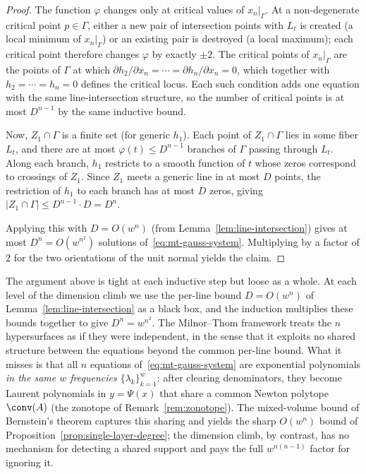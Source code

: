 \begin{proof}
The function $\varphi$ changes only at critical values of $x_n|_\Gamma$. At a non-degenerate critical point $p\in \Gamma$, either a new pair of intersection points with $L_t$ is created (a local minimum of $x_n|_\Gamma$) or an existing pair is destroyed (a local maximum); each critical point therefore changes $\varphi$ by exactly $\pm 2$. The critical points of $x_n|_\Gamma$ are the points of $\Gamma$ at which $\partial h_2/\partial x_n = \cdots = \partial h_n/\partial x_n = 0$, which together with $h_2 = \cdots = h_n = 0$ defines the critical locus. Each such condition adds one equation with the same line-intersection structure, so the number of critical points is at most $D^{n-1}$ by the same inductive bound.

Now, $Z_1\cap \Gamma$ is a finite set (for generic $h_1$). Each point of $Z_1 \cap \Gamma$ lies in some fiber $L_t$, and there are at most $\varphi(t) \leq D^{n-1}$ branches of $\Gamma$ passing through $L_t$. Along each branch, $h_1$ restricts to a smooth function of $t$ whose zeros correspond to crossings of $Z_1$. Since $Z_1$ meets a generic line in at most $D$ points, the restriction of $h_1$ to each branch has at most $D$ zeros, giving $|Z_1\cap \Gamma| \leq D^{n-1}\cdot D = D^n$.

Applying this with $D = O(w^n)$ (from Lemma~\ref{lem:line-intersection}) gives at most $D^n = O(w^{n^2})$ solutions of~\eqref{eq:mt-gauss-system}. Multiplying by a factor of $2$ for the two orientations of the unit normal yields the claim.
\end{proof}

\begin{remark}
The argument above is tight at each inductive step but loose as a whole. At each level of the dimension climb we use the per-line bound $D = O(w^n)$ of Lemma~\ref{lem:line-intersection} as a black box, and the induction multiplies these bounds together to give $D^n = w^{n^2}$. The Milnor--Thom framework treats the $n$ hypersurfaces as if they were independent, in the sense that it exploits no shared structure between the equations beyond the common per-line bound. What it misses is that all $n$ equations of~\eqref{eq:mt-gauss-system} are exponential polynomials \emph{in the same $w$ frequencies $\{\lambda_k\}_{k=1}^w$}: after clearing denominators, they become Laurent polynomials in $y = \Psi(x)$ that share a common Newton polytope $\conv(A)$ (the zonotope of Remark~\ref{rem:zonotope}). The mixed-volume bound of Bernstein's theorem captures this sharing and yields the sharp $O(w^n)$ bound of Proposition~\ref{prop:single-layer-degree}; the dimension climb, by contrast, has no mechanism for detecting a shared support and pays the full $w^{n(n-1)}$ factor for ignoring it.
\end{remark}
